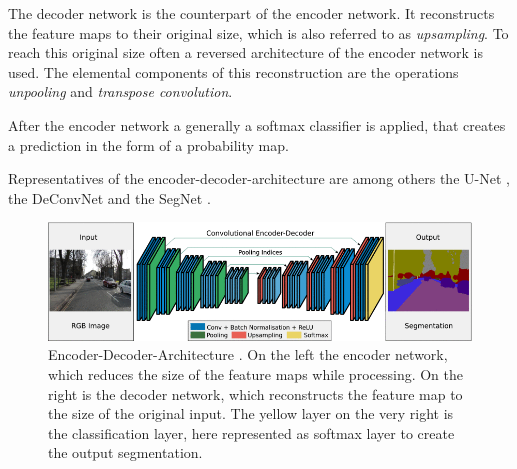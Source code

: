 The decoder network is the counterpart of the encoder network.
It reconstructs the feature maps to their original size, which is also referred to as \textit{upsampling}.
To reach this original size often a reversed architecture of the encoder network is used.
The elemental components of this reconstruction are the operations \textit{unpooling} and \textit{transpose convolution}.

After the encoder network a generally a softmax classifier is applied, that creates a prediction in the form of a probability map.



Representatives of the encoder-decoder-architecture are among others the U-Net \cite{RF15-U-Net}, the DeConvNet \cite{NHH15-DeConvNet} and the SegNet \cite{Bad17-EncoderDecoder}.
\cite{SZ15-VGG16}
\begin{figure}
	\includegraphics[width=\linewidth]{figures/chap223_SegNetArch.png}
	\caption{Encoder-Decoder-Architecture \cite{Bad17-EncoderDecoder}. On the left the encoder network, which reduces the size of the feature maps while processing. On the right is the decoder network, which reconstructs the feature map to the size of the original input. The yellow layer on the very right is the classification layer, here represented as softmax layer to create the output segmentation.}
	\label{fig:ch2:sec2:encoder-decoder}
\end{figure}

